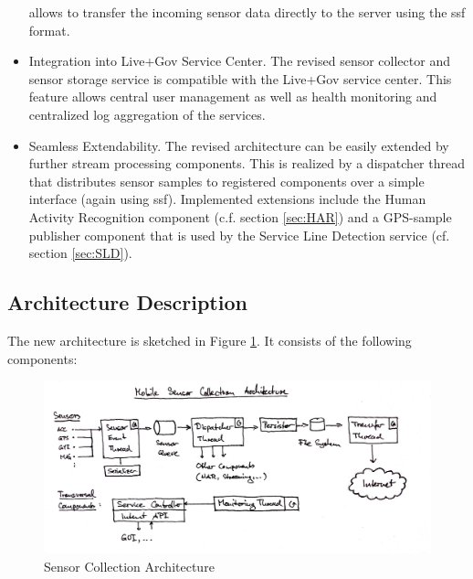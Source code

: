 \begin{itemize}
  allows to transfer the incoming sensor data directly to the server
  using the ssf format.
\item Integration into Live+Gov Service Center. The revised sensor
  collector and sensor storage service is compatible with the Live+Gov
  service center. This feature allows central user management as well
  as health monitoring and centralized log aggregation of the services.
\item Seamless Extendability. The revised architecture can be easily
  extended by further stream processing components. This is realized
  by a dispatcher thread that distributes sensor samples to registered
  components over a simple interface (again using ssf). Implemented
  extensions include the Human Activity Recognition component
  (c.f. section \ref{sec:HAR}) and a GPS-sample publisher component
  that is used by the Service Line Detection service (cf. section
  \ref{sec:SLD}).
\end{itemize}

\subsection{Architecture Description}

The new architecture is sketched in Figure \ref{fig:sc_architecture}.
It consists of the following components:

\begin{figure}[h]
\centering
\includegraphics[width=\textwidth]{img/sc/sc_architecture.jpg}
\caption{Sensor Collection Architecture}\label{fig:sc_architecture}
\end{figure}

